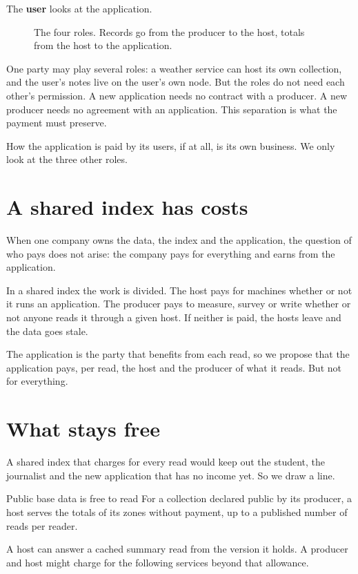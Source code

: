 \documentclass[11pt]{article}
\newcommand{\fig}[4][]{\begin{figure}[H]\centering\vspace{0.3em}\ixnew{figures/#2.tikz}\caption{#3}\label{fig:#4}\end{figure}}
\begin{document}
The \textbf{user} looks at the application.

\fig{roles}{The four roles. Records go from the producer to the host, totals from the host to the application.}{roles}

One party may play several roles: a weather service can host its own collection, and the user's notes live on the user's own node. But the roles do not need each other's permission. A new application needs no contract with a producer. A new producer needs no agreement with an application. This separation is what the payment must preserve.

How the application is paid by its users, if at all, is its own business. We only look at the three other roles.

\section{A shared index has costs}

When one company owns the data, the index and the application, the question of who pays does not arise: the company pays for everything and earns from the application.

In a shared index the work is divided. The host pays for machines whether or not it runs an application. The producer pays to measure, survey or write whether or not anyone reads it through a given host. If neither is paid, the hosts leave and the data goes stale.

The application is the party that benefits from each read, so we propose that the application pays, per read, the host and the producer of what it reads. But not for everything.

\section{What stays free}\hypertarget{ix:free}{}

A shared index that charges for every read would keep out the student, the journalist and the new application that has no income yet. So we draw a line.

\begin{guarantee}{Public base data is free to read}
For a collection declared public by its producer, a host serves the totals of its zones without payment, up to a published number of reads per reader.
\end{guarantee}

A host can answer a cached summary read from the version it holds. A producer and host might charge for the following services beyond that allowance.
\end{document}
